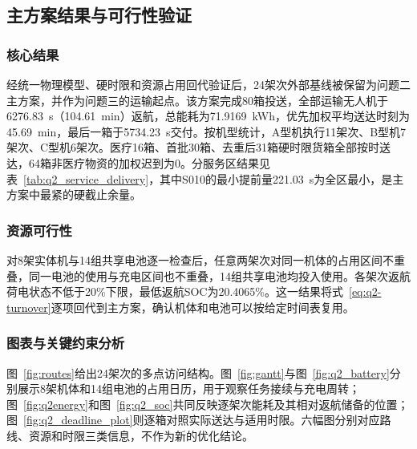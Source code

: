 \subsection{主方案结果与可行性验证}

\subsubsection{核心结果}

经统一物理模型、硬时限和资源占用回代验证后，24架次外部基线被保留为问题二主方案，并作为问题三的运输起点。该方案完成80箱投送，全部运输无人机于6276.83~s（104.61~min）返航，总能耗为71.9169~kWh，优先加权平均送达时刻为45.69~min，最后一箱于5734.23~s交付。按机型统计，A型机执行11架次、B型机7架次、C型机6架次。医疗16箱、首批30箱、去重后31箱硬时限货箱全部按时送达，64箱非医疗物资的加权迟到为0。分服务区结果见表~\ref{tab:q2_service_delivery}，其中S010的最小提前量221.03~s为全区最小，是主方案中最紧的硬截止余量。



\subsubsection{资源可行性}

对8架实体机与14组共享电池逐一检查后，任意两架次对同一机体的占用区间不重叠，同一电池的使用与充电区间也不重叠，14组共享电池均投入使用。各架次返航荷电状态不低于20\%下限，最低返航SOC为20.4065\%。这一结果将式~\eqref{eq:q2-turnover}逐项回代到主方案，确认机体和电池可以按给定时间表复用。

\subsubsection{图表与关键约束分析}

图~\ref{fig:routes}给出24架次的多点访问结构。图~\ref{fig:gantt}与图~\ref{fig:q2_battery}分别展示8架机体和14组电池的占用日历，用于观察任务接续与充电周转；图~\ref{fig:q2energy}和图~\ref{fig:q2_soc}共同反映逐架次能耗及其相对返航储备的位置；图~\ref{fig:q2_deadline_plot}则逐箱对照实际送达与适用时限。六幅图分别对应路线、资源和时限三类信息，不作为新的优化结论。

